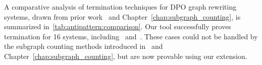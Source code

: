 
 

 




A comparative analysis of termination techniques for DPO graph rewriting systems, drawn from prior work~\cite{plump1995ontermination,plump2018modular,bruggink2014termination,bruggink2015proving,endrullis2024generalized_arxiv_v2,
overbeek2024termination_lmcs} and Chapter~\ref{chap:subgraph_counting}, is summarized in~\autoref{tab:antipattern:comparison}. 
Our tool successfully proves termination for 16 systems, including~\cite[Example D.3]{endrullis2024generalized_arxiv_v2} and~\cite[Example 1]{bruggink2014termination}. These cases could not be handled by the subgraph counting methods introduced in~\cite{overbeek2024termination_lmcs} and Chapter~\ref{chap:subgraph_counting}, but are now provable using our extension.
 

